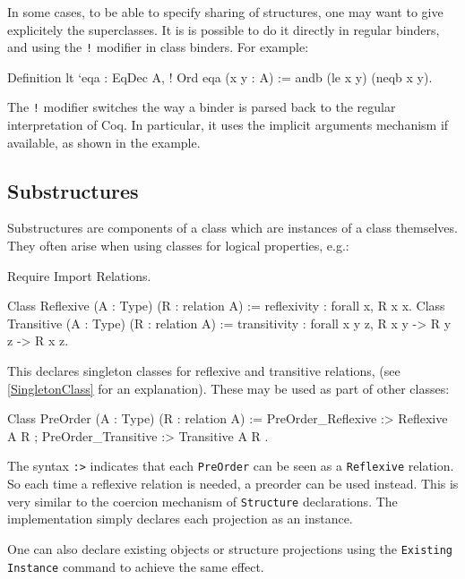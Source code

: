 In some cases, to be able to specify sharing of structures, one may want to give
explicitely the superclasses. It is is possible to do it directly in regular
binders, and using the \texttt{!} modifier in class binders. For
example:
\begin{coq_example*}
Definition lt `{eqa : EqDec A, ! Ord eqa} (x y : A) := 
  andb (le x y) (neqb x y).
\end{coq_example*}

The \texttt{!} modifier switches the way a binder is parsed back to the
regular interpretation of Coq. In particular, it uses the implicit
arguments mechanism if available, as shown in the example.

\subsection{Substructures}

Substructures are components of a class which are instances of a class
themselves. They often arise when using classes for logical properties,
e.g.:

\begin{coq_eval}
Require Import Relations.
\end{coq_eval}
\begin{coq_example*}
Class Reflexive (A : Type) (R : relation A) :=
  reflexivity : forall x, R x x.
Class Transitive (A : Type) (R : relation A) :=
  transitivity : forall x y z, R x y -> R y z -> R x z.
\end{coq_example*}

This declares singleton classes for reflexive and transitive relations,
(see \ref{SingletonClass} for an explanation).
These may be used as part of other classes:

\begin{coq_example*}
Class PreOrder (A : Type) (R : relation A) :=
{ PreOrder_Reflexive :> Reflexive A R ;
  PreOrder_Transitive :> Transitive A R }.
\end{coq_example*}

The syntax \texttt{:>} indicates that each \texttt{PreOrder} can be seen
as a \texttt{Reflexive} relation. So each time a reflexive relation is
needed, a preorder can be used instead. This is very similar to the
coercion mechanism of \texttt{Structure} declarations.
The implementation simply declares each projection as an instance. 

One can also declare existing objects or structure
projections using the \texttt{Existing Instance} command to achieve the 
same effect.

